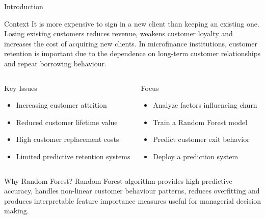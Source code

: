 \documentclass[10pt]{beamer}
\begin{document}
	\begin{frame}{Introduction}
		
		\small
		
		\begin{block}{Context}
			 It is more expensive to sign in a new client than keeping an existing one. Losing existing customers reduces revenue, weakens customer loyalty and increases the cost of acquiring new clients. In microfinance institutions, customer retention is important due to the dependence on long-term customer relationships and repeat borrowing behaviour.
		\end{block}
		
		\vspace{0.0002cm}
		
		\begin{columns}
			
			
			\begin{alertblock}{Key Issues}
				\begin{itemize}
					\item Increasing customer attrition
					\item Reduced customer lifetime value
					\item High customer replacement costs
					\item Limited predictive retention systems
				\end{itemize}
			\end{alertblock}
			
			
			\begin{exampleblock}{Focus}
				\begin{itemize}
					\item Analyze factors influencing churn
					\item Train a Random Forest model
					\item Predict customer exit behavior
					\item Deploy a prediction system
				\end{itemize}
			\end{exampleblock}
			
		\end{columns}
		
		\vspace{0.0003cm}
		
		\begin{block}{Why Random Forest?}
			Random Forest algorithm provides high predictive accuracy, handles non-linear customer behaviour patterns, reduces overfitting and produces interpretable feature importance measures useful for managerial decision making.
		\end{block}
		
	\end{frame}
	
\end{document}
